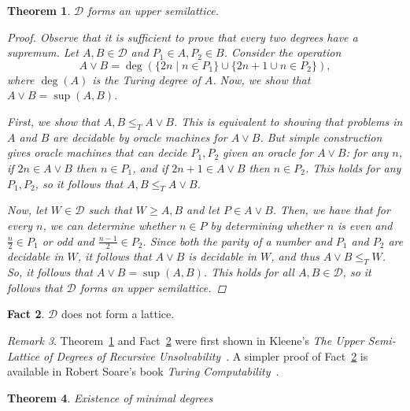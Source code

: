 \documentclass[psamsfonts]{amsart}
\newtheorem{thm}{Theorem}[section]
\theoremstyle{definition}
\newtheorem{fact}[thm]{Fact}
\theoremstyle{remark}
\newtheorem{rem}[thm]{Remark}
\numberwithin{equation}{section}
\begin{document}
\begin{thm}
  \label{thm:up_sem}
  $\mathcal{D}$ forms an upper semilattice.
    \begin{proof}
    Observe that it is sufficient to prove that every two degrees have a
    supremum. Let $A,B\in \mathcal{D}$ and  $P_1\in A, P_2 \in B$. Consider the operation
    \[
      A\vee B = \deg\left( \{2n \mid n \in P_1\}\cup\{2n+1\cup n\in P_2\} \right),
    \]
    where $\deg(A)$ is the Turing degree of $A$. Now, we show that $A\vee B = \sup(A,B)$.\par First, we show that
    $A,B \leq_T A \vee B$. This is equivalent to showing
    that problems in $A$ and $B$ are decidable by oracle machines for $A\vee
    B$. But simple construction gives oracle machines that can decide $P_1,P_2$
    given an oracle for $A\vee B$: for any $n$, if $2n\in A\vee B$ then
    $n\in P_1$, and if $2n+1\in A\vee B$ then $n\in P_2$. This holds for any
    $P_1,P_2$, so it follows that $A,B \leq_T A \vee
    B$. \par Now, let $W\in \mathcal{D}$ such that $W \geq
    A,B$ and let $P\in A\vee B$. Then, we have that for every $n$, we can
    determine whether $n\in P$ by determining whether $n$ is even and
    $\frac{n}{2}\in P_1$ or odd and $\frac{n-1}{2}\in P_2$. Since both the parity
    of a number and $P_1$ and $P_2$ are decidable in $W$, it follows that
    $A\vee B$ is decidable in $W$, and thus $A\vee B \leq_T W$. So, it follows
    that $A\vee B = \sup(A,B)$. This holds for all $A,B\in\mathcal{D}$, so it
    follows that $\mathcal{D}$ forms an upper semilattice.  
  \end{proof}
\end{thm}

\begin{fact}
  \label{fact:not_lat}
  $ \mathcal{D}$ does not form a lattice.
\end{fact}
\begin{rem}
Theorem~\ref{thm:up_sem} and Fact~\ref{fact:not_lat} were first shown in
Kleene's \emph{The Upper Semi-Lattice of Degrees of Recursive
  Unsolvability}~\cite{kleene54_upper_semi_lattic_degrees_recur_unsol}. A simpler proof
of Fact~\ref{fact:not_lat} is available in Robert Soare's book \emph{Turing Computability}~\cite[pp.~142--144]{soare16_turin_comput}.
\end{rem}

\begin{thm}
  Existence of minimal degrees
  \cite{spector56_degrees_recur_unsol}
  \cite{shoenfield66_theor_minim_degrees}
\end{thm}
\end{document}
